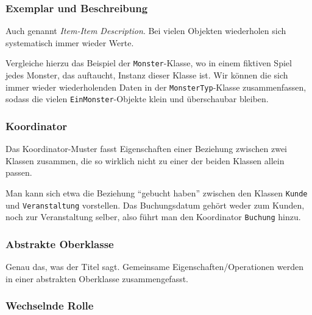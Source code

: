 \documentclass{panikzettel}
\begin{document}
\subsubsection{Exemplar und Beschreibung}

Auch genannt \emph{Item-Item Description}.
Bei vielen Objekten wiederholen sich systematisch immer wieder Werte.

Vergleiche hierzu das Beispiel der \lstinline{Monster}-Klasse, wo in einem fiktiven Spiel jedes Monster, das auftaucht, Instanz dieser Klasse ist.
Wir können die sich immer wieder wiederholenden Daten in der \lstinline{MonsterTyp}-Klasse zusammenfassen, sodass die vielen \lstinline{EinMonster}-Objekte klein und überschaubar bleiben.


\subsubsection{Koordinator}

Das Koordinator-Muster fasst Eigenschaften einer Beziehung zwischen zwei Klassen zusammen, die so wirklich nicht zu einer der beiden Klassen allein passen.

Man kann sich etwa die Beziehung ``gebucht haben'' zwischen den Klassen \lstinline{Kunde} und \lstinline{Veranstaltung} vorstellen.
Das Buchungsdatum gehört weder zum Kunden, noch zur Veranstaltung selber, also führt man den Koordinator \lstinline{Buchung} hinzu.

\subsubsection{Abstrakte Oberklasse}

Genau das, was der Titel sagt.
Gemeinsame Eigenschaften/Operationen werden in einer abstrakten Oberklasse zusammengefasst.

\subsubsection{Wechselnde Rolle}
\end{document}
